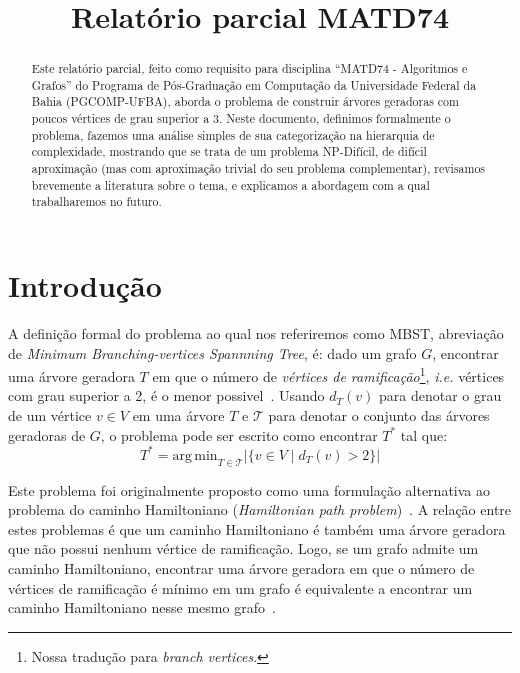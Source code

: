 \documentclass[conference]{IEEEtran}
\begin{document}
\title{Relatório parcial MATD74}

\author{
}

\maketitle

\begin{abstract}
  Este relatório parcial, feito como requisito para disciplina ``MATD74 - Algoritmos e Grafos'' do Programa de Pós-Graduação em Computação da Universidade Federal da Bahia (PGCOMP-UFBA), aborda o problema de construir árvores geradoras com poucos vértices de grau superior a 3.
  Neste documento, definimos formalmente o problema, fazemos uma análise simples de sua categorização na hierarquia de complexidade, mostrando que se trata de um problema NP-Difícil, de difícil aproximação (mas com aproximação trivial do seu problema complementar), revisamos brevemente a literatura sobre o tema, e explicamos a abordagem com a qual trabalharemos no futuro.
\end{abstract}

\section{Introdução}
A definição formal do problema ao qual nos referiremos como MBST, abreviação de \textit{Minimum Branching-vertices Spannning Tree}, é: dado um grafo $G$, encontrar uma árvore geradora $T$ em que o número de \emph{vértices de ramificação}\footnote{Nossa tradução para \textit{branch vertices}.}, \textit{i.e.} vértices com grau superior a 2, é o menor possivel~\cite{gargano2004}.
Usando $d_T(v)$ para denotar o grau de um vértice $v \in V$ em uma árvore $T$ e $\mathcal{T}$ para denotar o conjunto das árvores geradoras de $G$, o problema pode ser escrito como encontrar $T^*$ tal que:
\begin{equation}
  T^* = \mathrm{arg\,min}_{T \in \mathcal{T}} |\{v \in V \mid d_T(v) > 2 \}| 
\end{equation}

Este problema foi originalmente proposto como uma formulação alternativa ao problema do caminho Hamiltoniano (\textit{Hamiltonian path problem})~\cite{gargano2004}.
A relação entre estes problemas é que um caminho Hamiltoniano é também uma árvore geradora que não possui nenhum vértice de ramificação.
Logo, se um grafo admite um caminho Hamiltoniano, encontrar uma árvore geradora em que o número de vértices de ramificação é mínimo em um grafo é equivalente a encontrar um caminho Hamiltoniano nesse mesmo grafo~\cite{gargano2004}.
\end{document}
